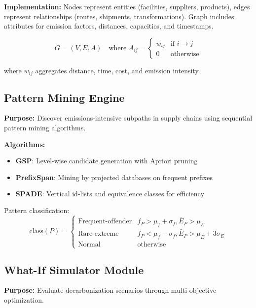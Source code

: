 \documentclass[11pt,a4paper]{article}
\begin{document}
\textbf{Implementation:} Nodes represent entities (facilities, suppliers, products), edges represent relationships (routes, shipments, transformations). Graph includes attributes for emission factors, distances, capacities, and timestamps.

\begin{equation}
G = (V, E, A) \quad \text{where } A_{ij} = 
\begin{cases} 
w_{ij} & \text{if } i \to j \\
0 & \text{otherwise}
\end{cases}
\end{equation}

where $w_{ij}$ aggregates distance, time, cost, and emission intensity.

\subsection{Pattern Mining Engine}

\textbf{Purpose:} Discover emissions-intensive subpaths in supply chains using sequential pattern mining algorithms.

\textbf{Algorithms:}
\begin{itemize}
    \item \textbf{GSP}: Level-wise candidate generation with Apriori pruning
    \item \textbf{PrefixSpan}: Mining by projected databases on frequent prefixes
    \item \textbf{SPADE}: Vertical id-lists and equivalence classes for efficiency
\end{itemize}

Pattern classification:
\begin{equation}
\mathrm{class}(P) = \begin{cases}
\text{Frequent-offender} & f_P > \mu_f + \sigma_f, \bar{E}_P > \mu_E \\
\text{Rare-extreme} & f_P < \mu_f - \sigma_f, \bar{E}_P > \mu_E + 3\sigma_E \\
\text{Normal} & \text{otherwise}
\end{cases}
\end{equation}

\subsection{What-If Simulator Module}

\textbf{Purpose:} Evaluate decarbonization scenarios through multi-objective optimization.
\end{document}
